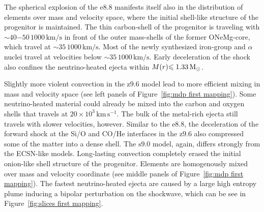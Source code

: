 \documentclass[fleqn,usenatbib]{mnras}
\newcommand{\solm}{\ensuremath{\rm{M_{\odot}}}\xspace}
\newcommand{\kms}{\ensuremath{\mathrm{km\, s^{-1}}}}
\newcommand{\onemg}{\ensuremath{\mathrm{e8.8}}\xspace}
\newcommand{\snine}{\ensuremath{\mathrm{s9.0}}\xspace}
\newcommand{\znine}{\ensuremath{\mathrm{z9.6}}\xspace}
\begin{document}
The spherical explosion of the \onemg manifests itself also in the distribution of elements over mass and velocity space, where the initial shell-like structure of the progenitor is maintained.
The thin carbon-shell of the progenitor is traveling with $\sim 40\mathord{-}50\,\mathrm{1000\,km/s}$ in front of the outer mass-shells of the former ONeMg-core, which travel at $\sim 35\,\mathrm{1000\,km/s}$. Most of the newly synthesized iron-group and $\alpha$ nuclei travel at velocities below $\sim 35\,\mathrm{1000\,km/s}$.
Early deceleration of the shock also confines the neutrino-heated ejecta within $M(r)\mathord{\le 1.33}\,\solm$.

Slightly more violent convection in the \znine model lead to more efficient mixing in mass and velocity space (see left panels of Figure~\ref{fig:mdp first mapping}). Some neutrino-heated material could already be mixed into the carbon and oxygen shells that travels at $20\times 10^3\,\kms$. The bulk of the metal-rich ejecta still travels with slower velocities, however. 
Similar to the \onemg, the deceleration of the forward shock at the Si/O and CO/He interfaces in the \znine also compressed some of the matter into a dense shell. 
The \snine model, again, differs strongly from the ECSN-like models. 
Long-lasting convection completely erased the initial onion-like shell structure of the progenitor. Elements are homogenously mixed over mass and velocity coordinate (see middle panels of Figure~\ref{fig:mdp first mapping}).
The fastest neutrino-heated ejecta are caused by a large high entropy plume inducing a bipolar perturbation on the shockwave, which can be see in Figure~\ref{fig:slices first mapping}.
\end{document}
